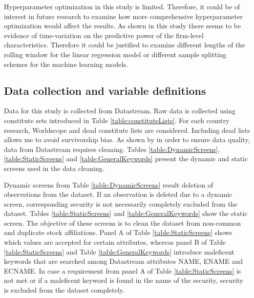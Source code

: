 \documentclass[12pt]{article}
\begin{document}
Hyperparameter optimization in this study is limited. Therefore, it could be of interest in future research to examine how more comprehensive hyperparameter optimization would affect the results. As shown in this study there seems to be evidence of time-variation on the predictive power of the firm-level characteristics. Therefore it could be justified to examine different lengths of the rolling window for the linear regression model or different sample splitting schemes for the machine learning models.

\clearpage

\begin{appendices}
\section{Data collection and variable definitions}
\renewcommand{\thefigure}{A.\arabic{figure}}
\setcounter{figure}{0}
\renewcommand{\thetable}{A.\arabic{table}}
\setcounter{table}{0}

Data for this study is collected from Datastream. Raw data is collected using constitute sets introduced in Table \ref{table:constituteLists}. For each country research, Worldscope and dead constitute lists are considered. Including dead lists allows me to avoid survivorship bias. As shown by \citet{Ince2006} in order to ensure data quality, data from Datastream requires cleaning.\footnotemark {} Tables \ref{table:DynamicScreens}, \ref{table:StaticScreens} and \ref{table:GeneralKeywords} present the dynamic and static screens used in the data cleaning. \par

Dynamic screens from Table \ref{table:DynamicScreens} result deletion of observations from the dataset. If an observation is deleted due to a dynamic screen, corresponding security is not necessarily completely excluded from the dataset. Tables \ref{table:StaticScreens} and \ref{table:GeneralKeywords} show the static screen. The objective of these screens is to clean the dataset from non-common and duplicate stock affiliations. Panel A of Table \ref{table:StaticScreens} shows which values are accepted for certain attributes, whereas panel B of Table \ref{table:StaticScreens} and Table \ref{table:GeneralKeywords} introduce maleficent keywords that are searched among Datastream attributes NAME, ENAME and ECNAME. In case a requirement from panel A of Table \ref{table:StaticScreens} is not met or if a maleficent keyword is found in the name of the security, security is excluded from the dataset completely. \par


\end{appendices}
\end{document}
